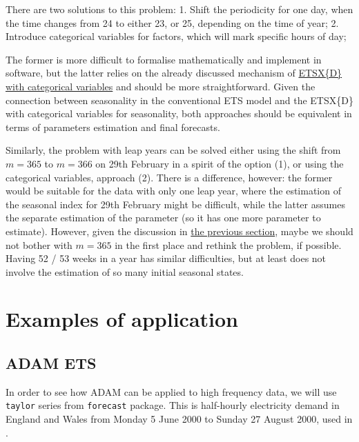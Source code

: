 \documentclass[
]{book}
\theoremstyle{definition}
\theoremstyle{definition}
\theoremstyle{definition}
\theoremstyle{definition}
\theoremstyle{remark}
\begin{document}
There are two solutions to this problem:
1. Shift the periodicity for one day, when the time changes from 24 to either 23, or 25, depending on the time of year;
2. Introduce categorical variables for factors, which will mark specific hours of day;

The former is more difficult to formalise mathematically and implement in software, but the latter relies on the already discussed mechanism of \protect\hyperlink{ETSXDynamicCategories}{ETSX\{D\} with categorical variables} and should be more straightforward. Given the connection between seasonality in the conventional ETS model and the ETSX\{D\} with categorical variables for seasonality, both approaches should be equivalent in terms of parameters estimation and final forecasts.

Similarly, the problem with leap years can be solved either using the shift from \(m=365\) to \(m=366\) on 29th February in a spirit of the option (1), or using the categorical variables, approach (2). There is a difference, however: the former would be suitable for the data with only one leap year, where the estimation of the seasonal index for 29th February might be difficult, while the latter assumes the separate estimation of the parameter (so it has one more parameter to estimate). However, given the discussion in \href{ETSXMultipleSeasonality}{the previous section}, maybe we should not bother with \(m=365\) in the first place and rethink the problem, if possible. Having 52 / 53 weeks in a year has similar difficulties, but at least does not involve the estimation of so many initial seasonal states.

\hypertarget{ADAMMultipleFrequenciesExamples}{%
\section{Examples of application}\label{ADAMMultipleFrequenciesExamples}}

\hypertarget{adam-ets}{%
\subsection{ADAM ETS}\label{adam-ets}}

In order to see how ADAM can be applied to high frequency data, we will use \texttt{taylor} series from \texttt{forecast} package. This is half-hourly electricity demand in England and Wales from Monday 5 June 2000 to Sunday 27 August 2000, used in \citet{Taylor2003a}.
\end{document}
